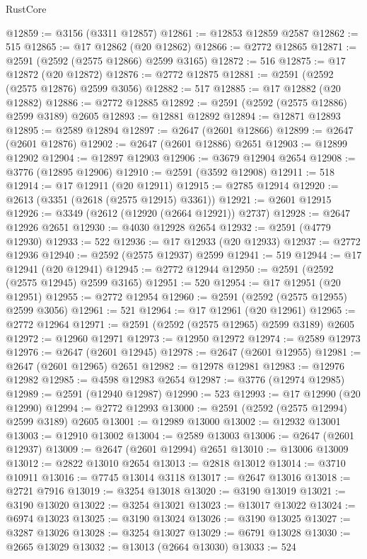 \begin{lexlean}{RustCore}
\begin{coremodule}
@12859 := @3156 (@3311 @12857)
@12861 := @12853 @12859 @2587
@12862 := 515
@12865 := @17 @12862 (@20 @12862)
@12866 := @2772 @12865
@12871 := @2591 (@2592 (@2575 @12866) @2599 @3165)
@12872 := 516
@12875 := @17 @12872 (@20 @12872)
@12876 := @2772 @12875
@12881 := @2591 (@2592 (@2575 @12876) @2599 @3056)
@12882 := 517
@12885 := @17 @12882 (@20 @12882)
@12886 := @2772 @12885
@12892 := @2591 (@2592 (@2575 @12886) @2599 @3189) @2605
@12893 := @12881 @12892
@12894 := @12871 @12893
@12895 := @2589 @12894
@12897 := @2647 (@2601 @12866)
@12899 := @2647 (@2601 @12876)
@12902 := @2647 (@2601 @12886) @2651
@12903 := @12899 @12902
@12904 := @12897 @12903
@12906 := @3679 @12904 @2654
@12908 := @3776 (@12895 @12906)
@12910 := @2591 (@3592 @12908)
@12911 := 518
@12914 := @17 @12911 (@20 @12911)
@12915 := @2785 @12914
@12920 := @2613 (@3351 (@2618 (@2575 @12915) @3361))
@12921 := @2601 @12915
@12926 := @3349 (@2612 (@12920 (@2664 @12921)) @2737)
@12928 := @2647 @12926 @2651
@12930 := @4030 @12928 @2654
@12932 := @2591 (@4779 @12930)
@12933 := 522
@12936 := @17 @12933 (@20 @12933)
@12937 := @2772 @12936
@12940 := @2592 (@2575 @12937) @2599
@12941 := 519
@12944 := @17 @12941 (@20 @12941)
@12945 := @2772 @12944
@12950 := @2591 (@2592 (@2575 @12945) @2599 @3165)
@12951 := 520
@12954 := @17 @12951 (@20 @12951)
@12955 := @2772 @12954
@12960 := @2591 (@2592 (@2575 @12955) @2599 @3056)
@12961 := 521
@12964 := @17 @12961 (@20 @12961)
@12965 := @2772 @12964
@12971 := @2591 (@2592 (@2575 @12965) @2599 @3189) @2605
@12972 := @12960 @12971
@12973 := @12950 @12972
@12974 := @2589 @12973
@12976 := @2647 (@2601 @12945)
@12978 := @2647 (@2601 @12955)
@12981 := @2647 (@2601 @12965) @2651
@12982 := @12978 @12981
@12983 := @12976 @12982
@12985 := @4598 @12983 @2654
@12987 := @3776 (@12974 @12985)
@12989 := @2591 (@12940 @12987)
@12990 := 523
@12993 := @17 @12990 (@20 @12990)
@12994 := @2772 @12993
@13000 := @2591 (@2592 (@2575 @12994) @2599 @3189) @2605
@13001 := @12989 @13000
@13002 := @12932 @13001
@13003 := @12910 @13002
@13004 := @2589 @13003
@13006 := @2647 (@2601 @12937)
@13009 := @2647 (@2601 @12994) @2651
@13010 := @13006 @13009
@13012 := @2822 @13010 @2654
@13013 := @2818 @13012
@13014 := @3710 @10911
@13016 := @7745 @13014 @3118
@13017 := @2647 @13016
@13018 := @2721 @7916
@13019 := @3254 @13018
@13020 := @3190 @13019
@13021 := @3190 @13020
@13022 := @3254 @13021
@13023 := @13017 @13022
@13024 := @6974 @13023
@13025 := @3190 @13024
@13026 := @3190 @13025
@13027 := @3287 @13026
@13028 := @3254 @13027
@13029 := @6791 @13028
@13030 := @2665 @13029
@13032 := @13013 (@2664 @13030)
@13033 := 524

\end{coremodule}
\end{lexlean}
